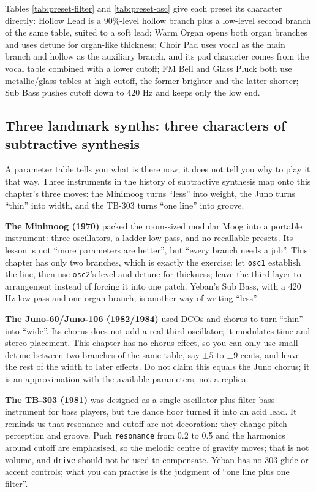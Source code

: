 Tables \ref{tab:preset-filter} and \ref{tab:preset-osc} give each preset its
character directly: Hollow Lead is a 90\%-level hollow branch plus a low-level
second branch of the same table, suited to a soft lead; Warm Organ opens both
organ branches and uses detune for organ-like thickness; Choir Pad uses vocal as
the main branch and hollow as the auxiliary branch, and its pad character comes
from the vocal table combined with a lower cutoff; FM Bell and Glass Pluck both
use metallic/glass tables at high cutoff, the former brighter and the latter
shorter; Sub Bass pushes cutoff down to 420 Hz and keeps only the low end.

\subsection{Three landmark synths: three characters of subtractive synthesis}

A parameter table tells you what is there now; it does not tell you why to play it that way. Three instruments in the history of subtractive synthesis map onto this chapter's three moves: the Minimoog turns ``less'' into weight, the Juno turns ``thin'' into width, and the TB-303 turns ``one line'' into groove.

\textbf{The Minimoog (1970)} packed the room-sized modular Moog into a portable instrument: three oscillators, a ladder low-pass, and no recallable presets. Its lesson is not ``more parameters are better'', but ``every branch needs a job''. This chapter has only two branches, which is exactly the exercise: let \texttt{osc1} establish the line, then use \texttt{osc2}'s level and detune for thickness; leave the third layer to arrangement instead of forcing it into one patch. Yeban's Sub Bass, with a 420 Hz low-pass and one organ branch, is another way of writing ``less''.

\textbf{The Juno-60/Juno-106 (1982/1984)} used DCOs and chorus to turn ``thin'' into ``wide''. Its chorus does not add a real third oscillator; it modulates time and stereo placement. This chapter has no chorus effect, so you can only use small detune between two branches of the same table, say $\pm5$ to $\pm9$ cents, and leave the rest of the width to later effects. Do not claim this equals the Juno chorus; it is an approximation with the available parameters, not a replica.

\textbf{The TB-303 (1981)} was designed as a single-oscillator-plus-filter bass instrument for bass players, but the dance floor turned it into an acid lead. It reminds us that resonance and cutoff are not decoration: they change pitch perception and groove. Push \texttt{resonance} from 0.2 to 0.5 and the harmonics around cutoff are emphasised, so the melodic centre of gravity moves; that is not volume, and \texttt{drive} should not be used to compensate. Yeban has no 303 glide or accent controls; what you can practise is the judgment of ``one line plus one filter''.

